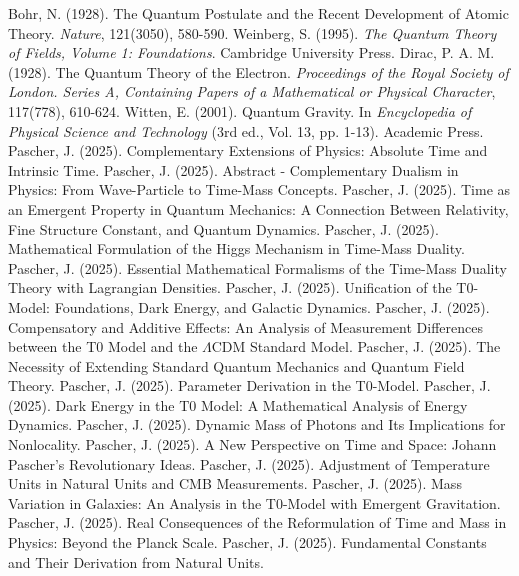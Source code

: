 \documentclass[a4paper,12pt]{article}
\theoremstyle{definition}
\theoremstyle{remark}
\begin{document}
	\begin{thebibliography}{99}
		 Bohr, N. (1928). The Quantum Postulate and the Recent Development of Atomic Theory. \textit{Nature}, 121(3050), 580-590.
		 Weinberg, S. (1995). \textit{The Quantum Theory of Fields, Volume 1: Foundations}. Cambridge University Press.
		 Dirac, P. A. M. (1928). The Quantum Theory of the Electron. \textit{Proceedings of the Royal Society of London. Series A, Containing Papers of a Mathematical or Physical Character}, 117(778), 610-624.
		 Witten, E. (2001). Quantum Gravity. In \textit{Encyclopedia of Physical Science and Technology} (3rd ed., Vol. 13, pp. 1-13). Academic Press.
		 Pascher, J. (2025). Complementary Extensions of Physics: Absolute Time and Intrinsic Time.
		 Pascher, J. (2025). Abstract - Complementary Dualism in Physics: From Wave-Particle to Time-Mass Concepts.
		 Pascher, J. (2025). Time as an Emergent Property in Quantum Mechanics: A Connection Between Relativity, Fine Structure Constant, and Quantum Dynamics.
		 Pascher, J. (2025). Mathematical Formulation of the Higgs Mechanism in Time-Mass Duality.
		 Pascher, J. (2025). Essential Mathematical Formalisms of the Time-Mass Duality Theory with Lagrangian Densities.
		 Pascher, J. (2025). Unification of the T0-Model: Foundations, Dark Energy, and Galactic Dynamics.
		 Pascher, J. (2025). Compensatory and Additive Effects: An Analysis of Measurement Differences between the T0 Model and the $\Lambda$CDM Standard Model.
		 Pascher, J. (2025). The Necessity of Extending Standard Quantum Mechanics and Quantum Field Theory.
		 Pascher, J. (2025). Parameter Derivation in the T0-Model.
		 Pascher, J. (2025). Dark Energy in the T0 Model: A Mathematical Analysis of Energy Dynamics.
		 Pascher, J. (2025). Dynamic Mass of Photons and Its Implications for Nonlocality.
		 Pascher, J. (2025). A New Perspective on Time and Space: Johann Pascher’s Revolutionary Ideas.
		 Pascher, J. (2025). Adjustment of Temperature Units in Natural Units and CMB Measurements.
		 Pascher, J. (2025). Mass Variation in Galaxies: An Analysis in the T0-Model with Emergent Gravitation.
		 Pascher, J. (2025). Real Consequences of the Reformulation of Time and Mass in Physics: Beyond the Planck Scale.
		 Pascher, J. (2025). Fundamental Constants and Their Derivation from Natural Units.
	\end{thebibliography}
	
\end{document}
